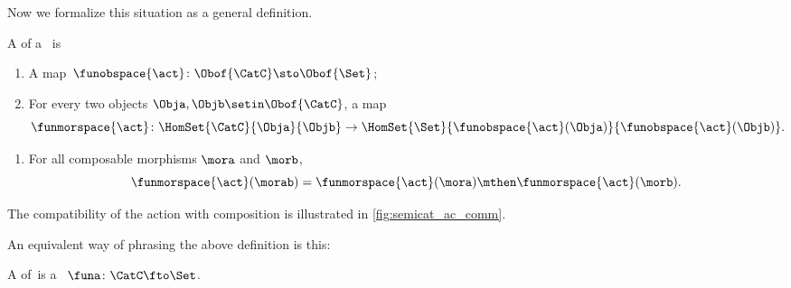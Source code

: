 Now we formalize this situation as a general definition.

\begin{ctdefinition}
    \label{def:semicategory-action}
    A  of a ~\CatC is

    \constit
    \begin{enumerate}
        \item A map~$\funobspace{\act} \colon \Obof{\CatC} \sto \Obof{\Set}$;
        \item For every two objects $\Obja, \Objb \setin \Obof{\CatC}$, a map
              \begin{equation}
                  \funmorspace{\act} \colon \HomSet{\CatC}{\Obja}{\Objb} \to \HomSet{\Set}{ \funobspace{\act}(\Obja)}{\funobspace{\act}(\Objb)}.
              \end{equation}
    \end{enumerate}

    \condit

    \begin{enumerate}
        \item For all composable morphisms $\mora$ and $\morb$,
              \begin{equation}
                  \funmorspace{\act}(\morab) = \funmorspace{\act}(\mora) \mthen \funmorspace{\act}(\morb).
              \end{equation}
    \end{enumerate}
\end{ctdefinition}

The compatibility of the action with composition is illustrated in \cref{fig:semicat_ac_comm}.

\begin{marginfigure}
    \centering
    \caption{}
    \label{fig:semicat_ac_comm}
\end{marginfigure}

An equivalent way of phrasing the above definition is this: 

\begin{ctdefinition}\label{def:semicat-action-redefined}
    A  of~\CatC is a ~$\funa\colon \CatC \fto \Set$.
\end{ctdefinition}



